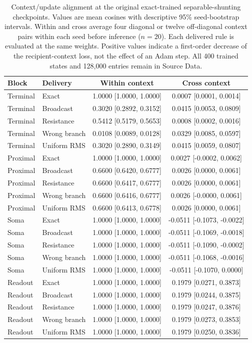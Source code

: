 \begin{table}[!htbp]
\centering
\small
\caption{Context/update alignment at the original exact-trained separable-shunting checkpoints. Values are mean cosines with descriptive 95\% seed-bootstrap intervals. Within and cross average four diagonal or twelve off-diagonal context pairs within each seed before inference ($n=20$). Each delivered rule is evaluated at the same weights. Positive values indicate a first-order decrease of the recipient-context loss, not the effect of an Adam step. All 400 trained states and 128,000 entries remain in Source Data.}
\label{tab:context_alignment}
\begin{tabular}{llcc}
\toprule
Block & Delivery & Within context & Cross context \\
\midrule
Terminal & Exact & 1.0000 [1.0000, 1.0000] & 0.0007 [0.0001, 0.0014] \\
Terminal & Broadcast & 0.3020 [0.2892, 0.3152] & 0.0415 [0.0053, 0.0809] \\
Terminal & Resistance & 0.5412 [0.5179, 0.5653] & 0.0008 [0.0002, 0.0016] \\
Terminal & Wrong branch & 0.0108 [0.0089, 0.0128] & 0.0329 [0.0085, 0.0597] \\
Terminal & Uniform RMS & 0.3020 [0.2890, 0.3149] & 0.0415 [0.0059, 0.0807] \\
Proximal & Exact & 1.0000 [1.0000, 1.0000] & 0.0027 [-0.0002, 0.0062] \\
Proximal & Broadcast & 0.6600 [0.6420, 0.6777] & 0.0026 [0.0000, 0.0061] \\
Proximal & Resistance & 0.6600 [0.6417, 0.6777] & 0.0026 [0.0000, 0.0061] \\
Proximal & Wrong branch & 0.6600 [0.6416, 0.6777] & 0.0026 [-0.0000, 0.0061] \\
Proximal & Uniform RMS & 0.6600 [0.6413, 0.6778] & 0.0026 [0.0000, 0.0061] \\
Soma & Exact & 1.0000 [1.0000, 1.0000] & -0.0511 [-0.1073, -0.0022] \\
Soma & Broadcast & 1.0000 [1.0000, 1.0000] & -0.0511 [-0.1069, -0.0018] \\
Soma & Resistance & 1.0000 [1.0000, 1.0000] & -0.0511 [-0.1090, -0.0002] \\
Soma & Wrong branch & 1.0000 [1.0000, 1.0000] & -0.0511 [-0.1068, -0.0016] \\
Soma & Uniform RMS & 1.0000 [1.0000, 1.0000] & -0.0511 [-0.1070, 0.0000] \\
Readout & Exact & 1.0000 [1.0000, 1.0000] & 0.1979 [0.0271, 0.3873] \\
Readout & Broadcast & 1.0000 [1.0000, 1.0000] & 0.1979 [0.0244, 0.3875] \\
Readout & Resistance & 1.0000 [1.0000, 1.0000] & 0.1979 [0.0247, 0.3876] \\
Readout & Wrong branch & 1.0000 [1.0000, 1.0000] & 0.1979 [0.0273, 0.3853] \\
Readout & Uniform RMS & 1.0000 [1.0000, 1.0000] & 0.1979 [0.0250, 0.3836] \\
\bottomrule
\end{tabular}
\end{table}
